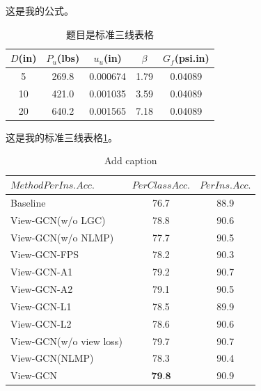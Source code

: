 \documentclass[a4paper,12pt]{ctexart} %
\begin{document}
    这是我的公式。




    \begin{table}[!htbp]
        \caption{题目是标准三线表格}\label{tab:001} \centering
        \begin{tabular}{ccccc}
            \toprule[1.5pt]
            $D$(in) & $P_u$(lbs) & $u_u$(in) & $\beta$ & $G_f$(psi.in)\\
            \midrule[1.0pt]
            5 & 269.8 & 0.000674 & 1.79 & 0.04089\\
            10 & 421.0 & 0.001035 & 3.59 & 0.04089\\
            20 & 640.2 & 0.001565 & 7.18 & 0.04089\\
            \bottomrule[1.5pt]
        \end{tabular}
    \end{table}
    这是我的标准三线表格\ref{tab:001}。
    
    \begin{table}[htbp]
        \centering
        \caption{Add caption}
        \begin{tabular}{lcc}
            \toprule[1.5pt]
            \rowcolor[rgb]{ .867,  .922,  .969} $Method Per Ins. Acc.$ & $Per Class Acc.$ & $Per Ins. Acc.$ \\
            \midrule
            Baseline & 76.7  & 88.9 \\
            View-GCN(w/o LGC) & 78.8  & 90.6 \\
            View-GCN(w/o NLMP) & 77.7  & 90.5 \\
            View-GCN-FPS & 78.2  & 90.3 \\
            View-GCN-A1 & 79.2  & 90.7 \\
            View-GCN-A2 & 79.1  & 90.5 \\
            View-GCN-L1 & 78.5  & 89.9 \\
            View-GCN-L2 & 78.6  & 90.6 \\
            View-GCN(w/o view loss) & 79.7  & 90.7 \\

            View-GCN(NLMP) & 78.3  & 90.4 \\
            \midrule
            \rowcolor[rgb]{ .867,  .922,  .969} View-GCN & $\textbf{79.8}$  & 90.9 \\
            \bottomrule[1.5pt]
        \end{tabular}%
    \label{tab:002}%
    \end{table}%
\end{document}
